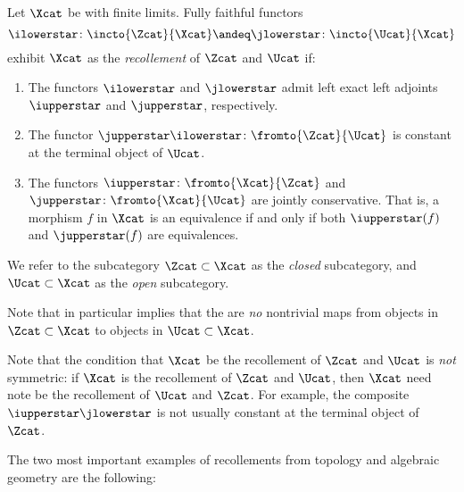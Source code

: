 \begin{definition}\label{def:recollement}
	Let $ \Xcat $ be \acategory with finite limits.
	Fully faithful functors
	\begin{equation*}
		\ilowerstar \colon \incto{\Zcat}{\Xcat} \andeq \jlowerstar \colon \incto{\Ucat}{\Xcat}
	\end{equation*}
	exhibit $ \Xcat $ as the \textit{recollement} of $ \Zcat $ and $ \Ucat $ if:
	\begin{enumerate}
		\item\label{def:recollement.1} The functors $ \ilowerstar $ and $ \jlowerstar $ admit left exact left adjoints $ \iupperstar $ and $ \jupperstar $, respectively.

		\item\label{def:recollement.2} The functor $ \jupperstar \ilowerstar \colon \fromto{\Zcat}{\Ucat} $ is constant at the terminal object of $ \Ucat $.

		\item\label{def:recollement.3} The functors $ \iupperstar \colon \fromto{\Xcat}{\Zcat} $ and $ \jupperstar \colon \fromto{\Xcat}{\Ucat} $ are jointly conservative.
		That is, a morphism $ f $ in $ \Xcat $ is an equivalence if and only if both $ \iupperstar(f) $ and $ \jupperstar(f) $ are equivalences.
	\end{enumerate}

	We refer to the subcategory $ \Zcat \subset \Xcat $ as the \textit{closed} subcategory, and $ \Ucat \subset \Xcat $ as the \textit{open} subcategory.
\end{definition}

\begin{remark}
	Note that  in particular implies that the are \textit{no} nontrivial maps from objects in $ \Zcat \subset \Xcat $ to objects in $ \Ucat \subset \Xcat $.
\end{remark}

\begin{warning}
	Note that the condition that $ \Xcat $ be the recollement of $ \Zcat $ and $ \Ucat $ is \textit{not} symmetric: if $ \Xcat $ is the recollement of $ \Zcat $ and $ \Ucat $, then $ \Xcat $ need note be the recollement of $ \Ucat $ and $ \Zcat $.
	For example, the composite $ \iupperstar \jlowerstar $ is not usually constant at the terminal object of $ \Zcat $.  
\end{warning}

The two most important examples of recollements from topology and algebraic geometry are the following:


